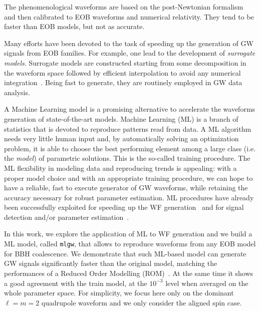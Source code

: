 The phenomenological waveforms are based on the post-Newtonian formalism and then calibrated 
to  EOB waveforms and numerical relativity. They tend to be faster than EOB models, but not as accurate.

Many efforts have been devoted to the task of speeding up the generation of GW signals from 
EOB families. For example, one lead to the development of \textit{surrogate models}. Surrogate 
models are constructed starting from some decomposition in the waveform space followed by efficient 
interpolation to avoid any  numerical integration~\cite{Purrer:2015tud,Bohe:2016gbl,Purrer:2017str,Lackey:2018zvw,Cotesta:2020qhw}. 
Being fast to generate, they are routinely employed in GW data analysis. 

A Machine Learning model is a promising alternative to accelerate the
waveforms generation of state-of-the-art models.
Machine Learning (ML) is a branch of statistics that is devoted to reproduce patterns read from data. 
A ML algorithm needs very little human input and, by automatically solving an optimization problem, 
it is able to choose the best performing element among a large class (i.e. the \textit{model}) of parametric solutions. 
This is the so-called training procedure. 
The ML flexibility in modeling data and reproducing trends is appealing: with a proper model choice 
and with an appropriate training procedure, we can hope to have a reliable, fast to execute generator 
of GW waveforms, while retaining the accuracy necessary for robust parameter estimation.
ML procedures have already been successfully exploited for speeding up the WF generation~\cite{Khan:2020fso, Chua_2019}
and for signal detection and/or parameter estimation~\cite{Gabbard:2017lja,George:2017pmj,George:2017vlv,Rebei:2018lzh,Khan:2020foe}.

In this work, we explore the application of ML to WF generation and we build a ML model, called \texttt{mlgw}, that allows to reproduce 
waveforms from any EOB model for BBH coalescence. We demonstrate that such ML-based model can generate 
GW signals significantly faster than the original model, 
matching the performances of a Reduced Order Modelling 
(ROM)~\cite{Purrer:2015tud,Bohe:2016gbl,Purrer:2017str}.  
At the same time it shows a good agreement with the train model, at the $10^{-3}$ level when 
averaged on the whole parameter space. For simplicity, we focus here only on the 
dominant $\ell=m=2$ quadrupole waveform and we only consider the aligned spin case.

